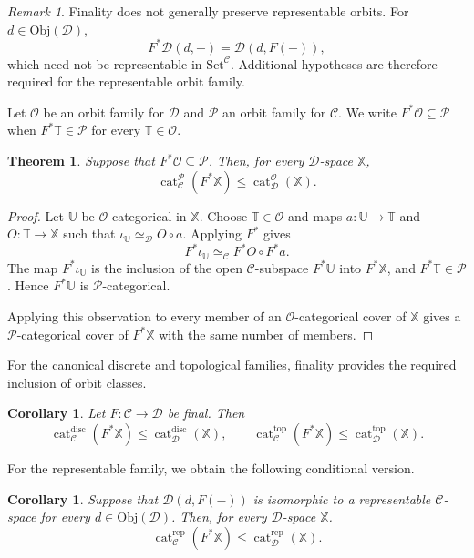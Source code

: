 \documentclass[12pt]{amsart}
\newtheorem{thm}[teo]{Theorem}
\newtheorem{cor}[teo]{Corollary}
\theoremstyle{definition}
\theoremstyle{remark}
\newtheorem{rem}{Remark}
\numberwithin{figure}{section}%
\newcommand{\CC}{\mathcal{C}}
\newcommand{\cat}{\mathop{\mathrm{cat}}}
\newcommand{\Dc}{\mathcal{D}}
\newcommand{\X}{\mathbb{X}}
\newcommand{\T}{\mathbb{T}}
\newcommand{\Obj}{\mathrm{Obj}}
\newcommand{\Set}{\mathrm{Set}}
\newcommand{\Uu}{\mathbb{U}}
\begin{document}
\begin{rem}\label{rem:representables-change-base}
Finality does not generally preserve representable orbits. For
$d\in\Obj(\Dc)$,
\[
F^*\Dc(d,-)=\Dc(d,F(-)),
\]
which need not be representable in $\Set^{\CC}$. Additional hypotheses
are therefore required for the representable orbit family.
\end{rem}

Let $\mathcal O$ be an orbit family for $\Dc$ and $\mathcal P$ an orbit
family for $\CC$. We write
$F^*\mathcal O\subseteq\mathcal P$ when
$F^*\T\in\mathcal P$ for every $\T\in\mathcal O$.

\begin{thm}
\label{prop:change-base-cover}
\label{prop:change-base-homotopy}
\label{prop:change-base-categorical-open}
\label{thm:change-base-LS-category}
Suppose that $F^*\mathcal O\subseteq\mathcal P$. Then, for every
$\Dc$-space $\X$,
\[
\cat_{\CC}^{\mathcal P}(F^*\X)
\leq
\cat_{\Dc}^{\mathcal O}(\X).
\]
\end{thm}

\begin{proof}
Let $\Uu$ be $\mathcal O$-categorical in $\X$. Choose
$\T\in\mathcal O$ and maps $a\colon\Uu\to\T$ and
$O\colon\T\to\X$ such that
$\iota_{\Uu}\simeq_{\Dc}O\circ a$. Applying $F^*$ gives
\[
F^*\iota_{\Uu}
\simeq_{\CC}
F^*O\circ F^*a.
\]
The map $F^*\iota_{\Uu}$ is the inclusion of the open $\CC$-subspace
$F^*\Uu$ into $F^*\X$, and $F^*\T\in\mathcal P$. Hence $F^*\Uu$ is
$\mathcal P$-categorical.

Applying this observation to every member of an
$\mathcal O$-categorical cover of $\X$ gives a
$\mathcal P$-categorical cover of $F^*\X$ with the same number of
members.
\end{proof}

For the canonical discrete and topological families, finality provides
the required inclusion of orbit classes.

\begin{cor}\label{cor:change-base-canonical-LS}
Let $F\colon\CC\to\Dc$ be final. Then
\[
\cat_{\CC}^{\mathrm{disc}}(F^*\X)
\leq
\cat_{\Dc}^{\mathrm{disc}}(\X),
\qquad
\cat_{\CC}^{\mathrm{top}}(F^*\X)
\leq
\cat_{\Dc}^{\mathrm{top}}(\X).
\]
\end{cor}

For the representable family, we obtain the following conditional
version.

\begin{cor}\label{cor:change-base-representable-LS}
Suppose that $\Dc(d,F(-))$ is isomorphic to a representable
$\CC$-space for every $d\in\Obj(\Dc)$. Then, for every $\Dc$-space $\X$.
\[
\cat_{\CC}^{\mathrm{rep}}(F^*\X)
\leq
\cat_{\Dc}^{\mathrm{rep}}(\X).
\]
\end{cor}
\end{document}
